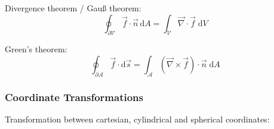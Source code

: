 			\noindent
			Divergence theorem / Gauß theorem:
			\begin{equation}
				\oint_{\partial\mathcal{V}}\vec{f}\cdot\vec{n}\,\mathrm{d}A=\int_{\mathcal{V}}\vec{\nabla}\cdot\vec{f}\;\mathrm{d}V
			\end{equation}

			\noindent
			Green's theorem:
			\begin{equation}
				\oint_{\partial\mathcal{A}}\vec{f}\cdot\mathrm{d}\vec{s}=\int_{\mathcal{A}}\left(\vec{\nabla}\times\vec{f}\right)\cdot\vec{n}\;\mathrm{d}A
			\end{equation}

		\subsubsection{Coordinate Transformations}
			\noindent
			Transformation between cartesian, cylindrical and spherical coordinates:

